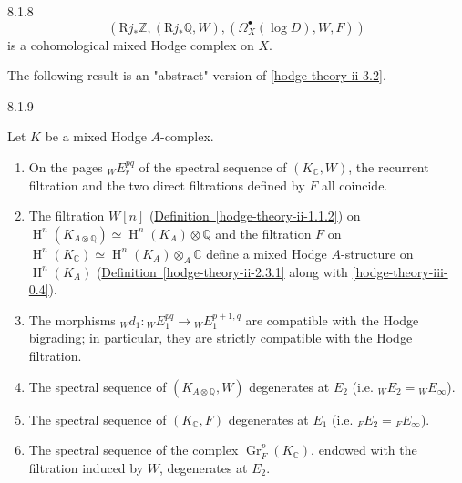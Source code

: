 \begin{scholium}{8.1.8}
    \[       (\mathrm {R} j_*\mathbb {Z},(\mathrm {R} j_*\mathbb {Q},W),(\Omega _X^\bullet (\log  D), W, F))     \]
    is a cohomological mixed Hodge complex on \(X\).\end{scholium}\par{}The following result is an "abstract" version of \cref{hodge-theory-ii-3.2}.\begin{scholium}{8.1.9}\label{hodge-theory-iii-8.1.9}\skipsinglepar\par{}Let \(K\) be a mixed Hodge \(A\)-complex.\begin{enumerate}
    
 \item[(i)]
      On the pages \({}_WE_r^{pq}\) of the spectral sequence of \((K_\mathbb {C},W)\), the recurrent filtration and the two direct filtrations defined by \(F\) all coincide.
    


    
 \item[(ii)]
      The filtration \(W[n]\) (\hyperref[hodge-theory-ii-1.1.2]{Definition~\ref*{hodge-theory-ii-1.1.2}}) on \(\operatorname {H}^n(K_{A\otimes \mathbb {Q}})\simeq \operatorname {H}^n(K_A)\otimes \mathbb {Q}\) and the filtration \(F\) on \(\operatorname {H}^n(K_\mathbb {C})\simeq \operatorname {H}^n(K_A)\otimes _A\mathbb {C}\) define a mixed Hodge \(A\)-structure on \(\operatorname {H}^n(K_A)\) (\hyperref[hodge-theory-ii-2.3.1]{Definition~\ref*{hodge-theory-ii-2.3.1}} along with \cref{hodge-theory-iii-0.4}).
    


    
 \item[(iii)]
      The morphisms \({}_Wd_1\colon {}_WE_1^{pq}\to {}_WE_1^{p+1,q}\) are compatible with the Hodge bigrading;
      in particular, they are strictly compatible with the Hodge filtration.
    


    
 \item[(iv)]
      The spectral sequence of \((K_{A\otimes \mathbb {Q}},W)\) degenerates at \(E_2\) (i.e. \({}_WE_2={}_WE_\infty \)).
    


    
 \item[(v)]
      The spectral sequence of \((K_\mathbb {C},F)\) degenerates at \(E_1\) (i.e. \({}_FE_2={}_FE_\infty \)).
    


    
 \item[(vi)]
      The spectral sequence of the complex \(\operatorname {Gr}_F^p(K_\mathbb {C})\), endowed with the filtration induced by \(W\), degenerates at \(E_2\).
    


\end{enumerate}
\end{scholium}
